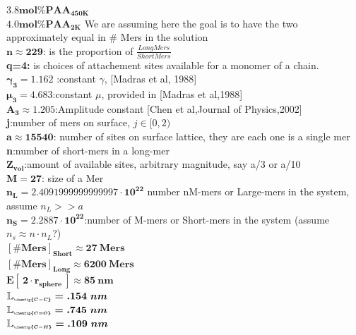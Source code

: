 \documentclass[journal=jacsat,manuscript=article]{achemso}
\begin{document}
$\boldsymbol{3.8mol\% PAA_{450K}}$\\
$\boldsymbol{4.0mol\% PAA_{2K}}$ We are assuming here the goal is to have the two approximately equal in \# Mers in the solution\\
$\boldsymbol{n\approx 229}$: is the proportion of $\frac{LongMers}{ShortMers}$\\
\textbf{q=4:} is choices of attachement sites available for a monomer of a chain.\\
$\boldsymbol{{\gamma}_{3}=1.162}$ :constant $\gamma$, [Madras et al, 1988]\\
$\boldsymbol{\mu_3=4.683}$:constant $\mu$, provided in [Madras et al,1988]\\
$\boldsymbol{A_3 \approx 1.205}$:Amplitude constant [Chen et al,Journal of Physics,2002]\\
\textbf{j}:number of mers on surface, $j\in[0,2)$\\
$\boldsymbol{a\approx 15540}$: number of sites on surface lattice, they are each one is a single mer\\
\textbf{n}:number of short-mers in a long-mer\\
$\boldsymbol{Z_{vol}}$:amount of available sites, arbitrary magnitude, say a/3 or a/10\\
$\boldsymbol{M=27}$: size of a Mer\\
$\boldsymbol{n_L=2.4091999999999997\cdot 10^{22}}$ number nM-mers or Large-mers in the system, assume $n_L >>a$\\
$\boldsymbol{n_S=2.2887\cdot 10^{22}}$:number of M-mers or Short-mers in the system (assume $n_s \approx n \cdot n_L$?)\\
$\boldsymbol{[\#Mers]_{Short} \approx 27~Mers}$\\
$\boldsymbol{[\#Mers]_{Long} \approx 6200~Mers}$\\
$\boldsymbol{E[~2\cdot r_{sphere}~]\approx 85~nm}$\\
$\boldsymbol{\mathbb{L}_{\scalebox{.82}{$\scriptscriptstyle \chemfig{C-C}$}}=.154~nm}$\\
$\boldsymbol{\mathbb{L}_{\scalebox{.82}{$\scriptscriptstyle \chemfig{C=O}$}}=.745~nm}$\\
$\boldsymbol{\mathbb{L}_{\scalebox{.82}{$\scriptscriptstyle \chemfig{C-H}$}}=.109~nm}$\\
\end{document}
